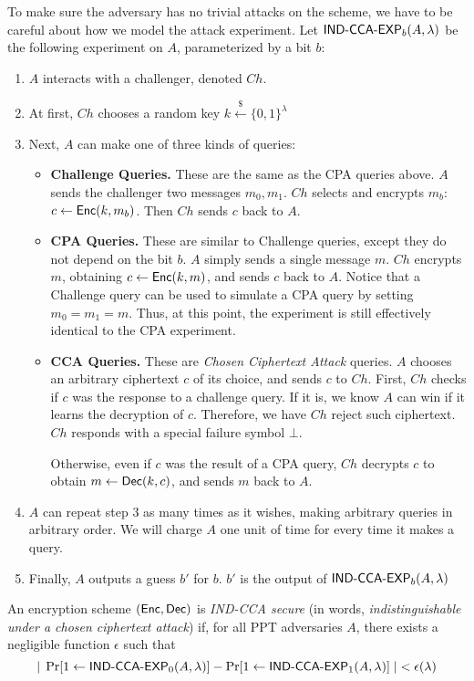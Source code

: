 To make sure the adversary has no trivial attacks on the scheme, we have to be careful about how we model the attack experiment.  Let $\text{\sf IND-CCA-EXP}_b(A,\lambda)$ be the following experiment on $A$, parameterized by a bit $b$:
\begin{enumerate}
	\item $A$ interacts with a challenger, denoted $Ch$.
	\item At first, $Ch$ chooses a random key $k\stackrel{\$}{\gets}\{0,1\}^\lambda$
	\item Next, $A$ can make one of three kinds of queries:
	\begin{itemize}
		\item {\bf Challenge Queries.}  These are the same as the CPA queries above.  $A$ sends the challenger two messages $m_0,m_1$.  $Ch$ selects and encrypts $m_b$: $c\gets{\sf Enc}(k,m_b)$.  Then $Ch$ sends $c$ back to $A$.
		\item {\bf CPA Queries.} These are similar to Challenge queries, except they do not depend on the bit $b$.  $A$ simply sends a single message $m$.  $Ch$ encrypts $m$, obtaining $c\gets{\sf Enc}(k,m)$, and sends $c$ back to $A$.  Notice that a Challenge query can be used to simulate a CPA query by setting $m_0=m_1=m$.  Thus, at this point, the experiment is still effectively identical to the CPA experiment.
		\item {\bf CCA Queries.} These are \emph{Chosen Ciphertext Attack} queries.  $A$ chooses an arbitrary ciphertext $c$ of its choice, and sends $c$ to $Ch$.  First, $Ch$ checks if $c$ was the response to a challenge query.  If it is, we know $A$ can win if it learns the decryption of $c$.  Therefore, we have $Ch$ reject such ciphertext.  $Ch$ responds with a special failure symbol $\bot$.
		
		Otherwise, even if $c$ was the result of a CPA query, $Ch$ decrypts $c$ to obtain $m\gets{\sf Dec}(k,c)$, and sends $m$ back to $A$.
	\end{itemize}
	\item $A$ can repeat step 3 as many times as it wishes, making arbitrary queries in arbitrary order.  We will charge $A$ one unit of time for every time it makes a query.
	\item Finally, $A$ outputs a guess $b'$ for $b$.  $b'$ is the output of $\text{\sf IND-CCA-EXP}_b(A,\lambda)$
\end{enumerate}

\begin{definition} An encryption scheme $({\sf Enc},{\sf Dec})$ is \emph{{\sf IND-CCA} secure} (in words, \emph{indistinguishable under a chosen ciphertext attack}) if, for all PPT adversaries $A$, there exists a negligible function $\epsilon$ such that
	\[|\;\Pr[1\gets\text{\sf IND-CCA-EXP}_0(A,\lambda)]-\Pr[1\gets\text{\sf IND-CCA-EXP}_1(A,\lambda)]\;|<\epsilon(\lambda)\]
\end{definition}

